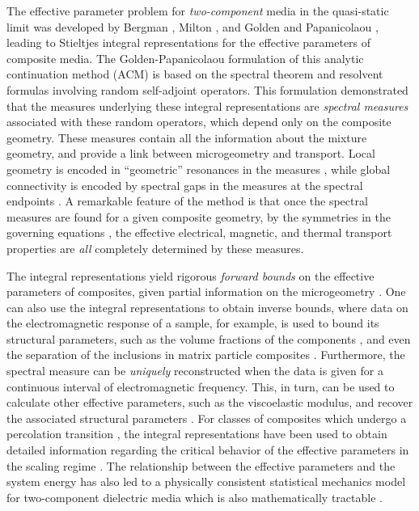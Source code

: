 \documentclass{cmslatex}
\begin{document}
The effective parameter problem for \emph{two-component} media in the
quasi-static limit was developed by Bergman \cite{Bergman:PRL-1285},
Milton \cite{Milton:APL-300}, and Golden and Papanicolaou
\cite{Golden:CMP-473}, leading to Stieltjes integral representations 
for the effective parameters of composite media. The
Golden-Papanicolaou formulation of this analytic continuation method
(ACM) is based on the spectral theorem and resolvent formulas
involving random self-adjoint operators. This formulation demonstrated
that the measures underlying these integral representations are
\emph{spectral measures} associated with these random operators, which
depend only on the composite geometry. These measures contain all the
information about the mixture geometry, and provide a link between
microgeometry and transport. Local geometry is encoded in
``geometric'' resonances in the measures
\cite{Jonckheere_Luck_JPA_1998}, while global connectivity is encoded
by spectral gaps in the measures at the spectral endpoints
\cite{Murphy:JMP:063506,Jonckheere_Luck_JPA_1998}. A remarkable
feature of the method is that once the spectral measures are found for 
a given composite geometry, by the symmetries in the governing
equations \cite{MILTON:2002:TC}, the effective electrical, magnetic,
and thermal transport properties are \emph{all} completely determined
by these measures.





The integral representations yield rigorous \emph{forward bounds} on
the effective parameters of composites, given partial information on
the microgeometry
\cite{Bergman:PRL-1285,Milton:APL-300,Golden:CMP-473,Bergman:AP-78}. One  
can also use the integral representations to obtain inverse bounds,
where data on the electromagnetic response of a sample, for example,
is used to bound its structural parameters, such as the volume
fractions of the components
\cite{Cherkaeva:WRM-437,Cherkaeva:IP-1203,Cherkaeva:IP-065008,Zhang:JCP-5390,Bonifasi-Lista:PMB-3063,Cherkaev:JBiomech-345,Day:JPCM-99,Golden:JBM:337},
and even the separation of the inclusions in matrix particle
composites \cite{Orum:PRSLA:2012}. Furthermore, the spectral
measure can be \emph{uniquely} reconstructed \cite{Cherkaeva:IP-1203}
when the data is given for a continuous interval of electromagnetic
frequency. This, in turn, can be used to calculate other effective
parameters, such as the viscoelastic modulus, and recover the
associated structural parameters
\cite{Cherkaeva:IP-1203,Cherkaeva:IP-065008,Zhang:JCP-5390,Bonifasi-Lista:PMB-3063,Cherkaev:JBiomech-345,Day:JPCM-99,Golden:JBM:337}. For
classes of composites which undergo a percolation transition
\cite{Stauffer-92,Torquato:RHM-02}, the integral representations have
been used to obtain detailed information regarding the critical
behavior of the effective parameters in the scaling regime
\cite{Golden:PRL-3935,Murphy:JMP:063506}. The relationship between the
effective parameters and the system energy \cite{Murphy:JMP:063506}
has also led to a physically consistent statistical mechanics model
for two-component dielectric media which is also mathematically
tractable \cite{Murphy_Thermo_Stat_Mech}.   
\end{document}
